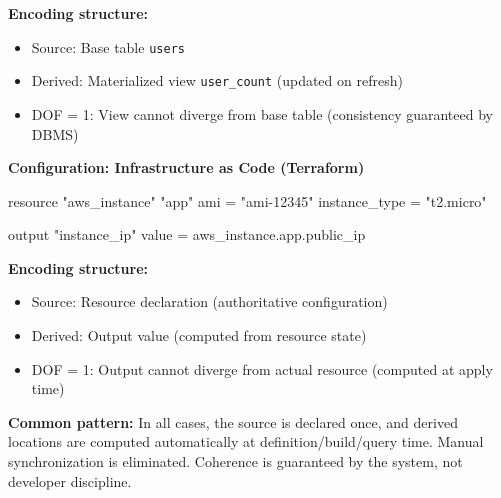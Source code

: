 \textbf{Encoding structure:}
\begin{itemize}
\tightlist
\item Source: Base table \texttt{users}
\item Derived: Materialized view \texttt{user\_count} (updated on refresh)
\item DOF = 1: View cannot diverge from base table (consistency guaranteed by DBMS)
\end{itemize}

\textbf{Configuration: Infrastructure as Code (Terraform)}

\begin{code}
resource "aws_instance" "app" {
  ami = "ami-12345"
  instance_type = "t2.micro"
}

output "instance_ip" {
  value = aws_instance.app.public_ip
}
\end{code}

\textbf{Encoding structure:}
\begin{itemize}
\tightlist
\item Source: Resource declaration (authoritative configuration)
\item Derived: Output value (computed from resource state)
\item DOF = 1: Output cannot diverge from actual resource (computed at apply time)
\end{itemize}

\textbf{Common pattern:} In all cases, the source is declared once, and derived locations are computed automatically at definition/build/query time. Manual synchronization is eliminated. Coherence is guaranteed by the system, not developer discipline.

